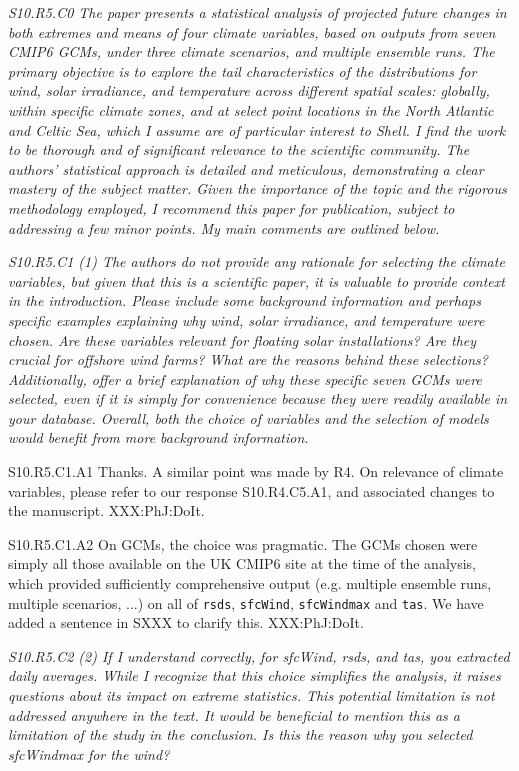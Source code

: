 \documentclass[a4paper,10pt]{article}
\providecommand{\RS}{\texttt{rsds}\xspace}
\providecommand{\WS}{\texttt{sfcWind}\xspace}
\providecommand{\WM}{\texttt{sfcWindmax}\xspace}
\providecommand{\TA}{\texttt{tas}\xspace}
\begin{document}
	\emph{S10.R5.C0 The paper presents a statistical analysis of projected future changes in both extremes and means of four climate variables, based on outputs from seven CMIP6 GCMs, under three climate scenarios, and multiple ensemble runs. The primary objective is to explore the tail characteristics of the distributions for wind, solar irradiance, and temperature across different spatial scales: globally, within specific climate zones, and at select point locations in the North Atlantic and Celtic Sea, which I assume are of particular interest to Shell. I find the work to be thorough and of significant relevance to the scientific community. The authors' statistical approach is detailed and meticulous, demonstrating a clear mastery of the subject matter. Given the importance of the topic and the rigorous methodology employed, I recommend this paper for publication, subject to addressing a few minor points. My main comments are outlined below.}

	\emph{S10.R5.C1 (1) The authors do not provide any rationale for selecting the climate variables, but given that this is a scientific paper, it is valuable to provide context in the introduction. Please include some background information and perhaps specific examples explaining why wind, solar irradiance, and temperature were chosen. Are these variables relevant for floating solar installations? Are they crucial for offshore wind farms? What are the reasons behind these selections? Additionally, offer a brief explanation of why these specific seven GCMs were selected, even if it is simply for convenience because they were readily available in your database. Overall, both the choice of variables and the selection of models would benefit from more background information.}

	S10.R5.C1.A1 Thanks. A similar point was made by R4. On relevance of climate variables, please refer to our response S10.R4.C5.A1, and associated changes to the manuscript. XXX:PhJ:DoIt.
	
	S10.R5.C1.A2 On GCMs, the choice was pragmatic. The GCMs chosen were simply all those available on the UK CMIP6 site at the time of the analysis, which provided sufficiently comprehensive output (e.g. multiple ensemble runs, multiple scenarios, ...) on all of \RS, \WS, \WM and \TA. We have added a sentence in SXXX to clarify this. XXX:PhJ:DoIt.  

	\emph{S10.R5.C2 (2) If I understand correctly, for sfcWind, rsds, and tas, you extracted daily averages. While I recognize that this choice simplifies the analysis, it raises questions about its impact on extreme statistics. This potential limitation is not addressed anywhere in the text. It would be beneficial to mention this as a limitation of the study in the conclusion. Is this the reason why you selected sfcWindmax for the wind?}
\end{document}
